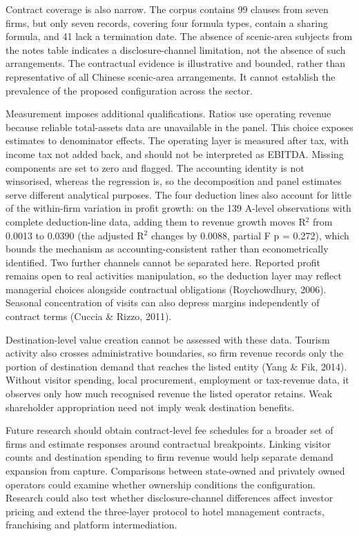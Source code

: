\documentclass[review,3p,times]{elsarticle}
\begin{document}
Contract coverage is also narrow. The corpus contains 99 clauses from seven firms, but only seven records, covering four formula types, contain a sharing formula, and 41 lack a termination date. The absence of scenic-area subjects from the notes table indicates a disclosure-channel limitation, not the absence of such arrangements. The contractual evidence is illustrative and bounded, rather than representative of all Chinese scenic-area arrangements. It cannot establish the prevalence of the proposed configuration across the sector.

Measurement imposes additional qualifications. Ratios use operating revenue because reliable total-assets data are unavailable in the panel. This choice exposes estimates to denominator effects. The operating layer is measured after tax, with income tax not added back, and should not be interpreted as EBITDA. Missing components are set to zero and flagged. The accounting identity is not winsorised, whereas the regression is, so the decomposition and panel estimates serve different analytical purposes. The four deduction lines also account for little of the within-firm variation in profit growth: on the 139 A-level observations with complete deduction-line data, adding them to revenue growth moves R\ensuremath{^2} from 0.0013 to 0.0390 (the adjusted R\ensuremath{^2} changes by 0.0088, partial F p = 0.272), which bounds the mechanism as accounting-consistent rather than econometrically identified. Two further channels cannot be separated here. Reported profit remains open to real activities manipulation, so the deduction layer may reflect managerial choices alongside contractual obligations (Roychowdhury, 2006). Seasonal concentration of visits can also depress margins independently of contract terms (Cuccia \& Rizzo, 2011).

Destination-level value creation cannot be assessed with these data. Tourism activity also crosses administrative boundaries, so firm revenue records only the portion of destination demand that reaches the listed entity (Yang \& Fik, 2014). Without visitor spending, local procurement, employment or tax-revenue data, it observes only how much recognised revenue the listed operator retains. Weak shareholder appropriation need not imply weak destination benefits.

Future research should obtain contract-level fee schedules for a broader set of firms and estimate responses around contractual breakpoints. Linking visitor counts and destination spending to firm revenue would help separate demand expansion from capture. Comparisons between state-owned and privately owned operators could examine whether ownership conditions the configuration. Research could also test whether disclosure-channel differences affect investor pricing and extend the three-layer protocol to hotel management contracts, franchising and platform intermediation.
\end{document}
